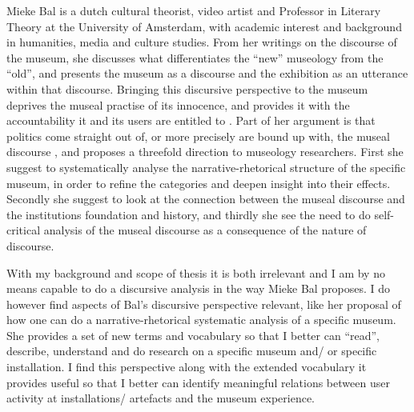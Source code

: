 Mieke Bal is a dutch cultural theorist, video artist and Professor in Literary Theory at the University of Amsterdam, with academic interest and background in humanities, media and culture studies. From her writings on the discourse of the museum, she discusses what differentiates the “new” museology from the “old”, and presents the museum as a discourse and the exhibition as an utterance within that discourse. Bringing this discursive perspective to the museum deprives the museal practise of its innocence, and provides it with the accountability it and its users are entitled to \autocite[p. 214]{Thi_book}. Part of her argument is that politics come straight out of, or more precisely are bound up with, the museal discourse \autocite[p. 214]{Thi_book}, and proposes a threefold direction to museology researchers. First she suggest to systematically analyse the narrative-rhetorical structure of the specific museum, in order to refine the categories and deepen insight into their effects. Secondly she suggest to look at the connection between the museal discourse and the institutions foundation and history, and thirdly she see the need to do self-critical analysis of the museal discourse as a consequence of the nature of discourse.

With my background and scope of thesis it is both irrelevant and I am by no means capable to do a discursive analysis in the way Mieke Bal proposes. I do however find aspects of Bal’s discursive perspective relevant, like her proposal of how one can do a narrative-rhetorical systematic analysis of a specific museum. She provides a set of new terms and vocabulary so that I better can “read”, describe, understand and do research on a specific museum and/ or specific installation. I find this perspective along with the extended vocabulary it provides useful so that I better can identify meaningful relations between user activity at installations/ artefacts and the museum experience.